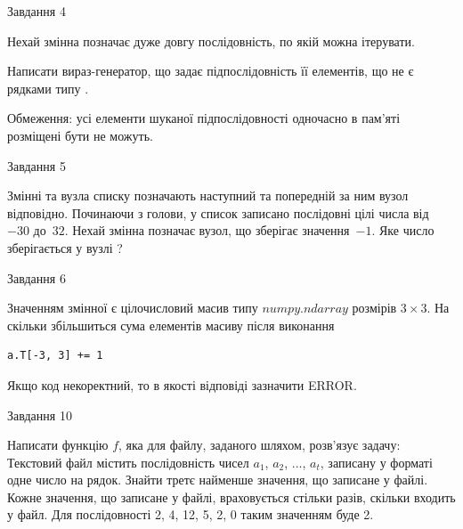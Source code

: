 \documentclass[12pt, ukrainian]{article}
\begin{document}
{\begin{minipage}[t]{8.0cm}
\end{minipage}


               
{\begin{center}Завдання {4}\end{center}}
\vspace{-4mm}
Нехай змінна  позначає дуже довгу послідовність, по якій можна ітерувати.

Написати вираз-генератор, що задає підпослідовність її елементів, що не є рядками типу .

Обмеження: усі елементи шуканої підпослідовності одночасно в пам'яті розміщені бути не можуть.\par

\vspace{10mm}
               
{\begin{center}Завдання {5}\end{center}}
\vspace{-4mm}
Змінні  та  вузла списку позначають наступний та попередній за ним вузол відповідно. Починаючи з голови, у список записано послідовні цілі числа від~$-30$ до~$32$. Нехай змінна  позначає вузол, що зберігає значення~$-1$.
Яке число зберігається у вузлі  ?\par

               
{\begin{center}Завдання {6}\end{center}}
\vspace{-4mm}
Значенням змінної  є цілочисловий масив типу $numpy.ndarray$ розмірів $3{\times}3$. На скільки збільшиться сума елементів масиву  після виконання
\begin{verbatim}
a.T[-3, 3] += 1
\end{verbatim}


Якщо код некоректний, то в якості відповіді зазначити ERROR.\par

               
{\begin{center}Завдання {10}\end{center}}
\vspace{-4mm}

Написати функцію $f$, яка для файлу, заданого шляхом, розв’язує задачу:\\ Текстовий файл містить послідовність чисел $a_1$, $a_2$, $\ldots$, $a_t$, записану у форматі одне число на рядок. Знайти третє найменше значення, що записане у файлі. Кожне значення, що записане у файлі, враховується стільки разів, скільки входить у файл. Для послідовності 2, 4, 12, 5, 2, 0 таким значенням буде 2.

}
\end{document}
